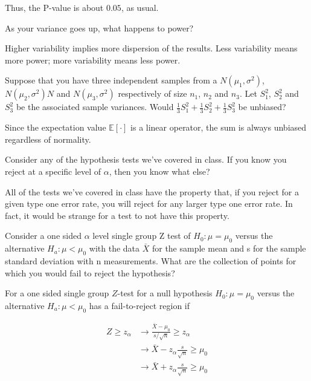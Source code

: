 \documentclass{homework}
\begin{document}
Thus, the P-value is about $0.05$, as usual. \\

\begin{tcolorbox}[title=Question 10]
As your variance goes up, what happens to power?
\end{tcolorbox}

Higher variability implies more dispersion of the results. Less variability means more power; more variability means less power. \\

\begin{tcolorbox}[title=Question 11]
Suppose that you have three independent samples from a $N(\mu_1, \sigma^2)$, $N(\mu_2, \sigma^2)N$ and $N(\mu_3, \sigma^2)$ respectively of size $n_1$, $n_2$ and $n_3$. Let $S_1^2$, $S_2^2$ and $S_3^2$ be the associated sample variances. Would $\frac{1}{3}S_1^2 + \frac{1}{3} S_2^2 + \frac{1}{3} S_3^2$ be unbiased?
\end{tcolorbox}

Since the expectation value $\mathds{E}[\cdot]$ is a linear operator, the sum is always unbiased regardless of normality. \\

\begin{tcolorbox}[title=Question 12]
Consider any of the hypothesis tests we've covered in class. If you know you reject at a specific level of $\alpha$, then you know what else?
\end{tcolorbox}

All of the tests we've covered in class have the property that, if you reject for a given type one error rate, you will reject for any larger type one error rate. In fact, it would be strange for a test to not have this property. \\

\begin{tcolorbox}[title=Question 13]
Consider a one sided $\alpha$ level single group Z test of $H_0 : \mu = \mu_0$ versus the alternative $H_a : \mu < \mu_0$ with the data $\bar X$ for the sample mean and s for the sample standard deviation with n measurements. What are the collection of points for which you would fail to reject the hypothesis?
\end{tcolorbox}

For a one sided single group $Z$-test for a null hypothesis $H_0 : \mu = \mu_0$ versus the alternative $H_a : \mu < \mu_0$ has a fail-to-reject region if 

\begin{align*}
    Z \geq z_{\alpha} &\rightarrow \frac{\bar{X}-\mu_0}{s/\sqrt{n}} \geq z_{\alpha} \\
    &\rightarrow \bar{X} - z_{\alpha}\frac{s}{\sqrt{n}} \geq \mu_0 \\
    &\rightarrow  \bar{X} + z_{\alpha}\frac{s}{\sqrt{n}} \geq \mu_0
\end{align*}
\end{document}
